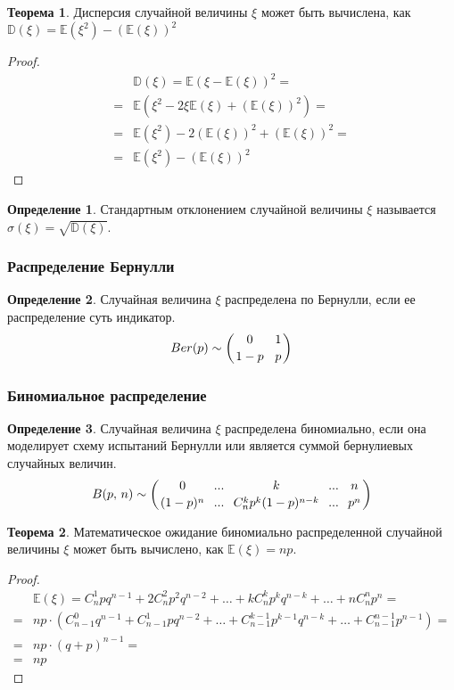\documentclass[12pt]{article}
\theoremstyle{definition}
\newtheorem{theorem}{Теорема}[section]
\newtheorem{definition}{Определение}
\newcommand{\E}{\mathbb{E}}
\newcommand{\D}{\mathbb{D}}
\begin{document}
\begin{theorem}
    Дисперсия случайной величины $\xi$ может быть вычислена, как $\D(\xi)=\E(\xi^2)-(\E(\xi))^2$
\end{theorem}

\begin{proof}
    \begin{align*}
        &\D(\xi)=\E(\xi-\E(\xi))^2=\\
        =&\E(\xi^2-2\xi\E(\xi)+(\E(\xi))^2)=\\
        =&\E(\xi^2)-2(\E(\xi))^2+(\E(\xi))^2=\\
        =&\E(\xi^2)-(\E(\xi))^2
    \end{align*}
\end{proof}

\begin{definition}
    Стандартным отклонением случайной величины $\xi$ называется $\sigma(\xi)=\sqrt{\D(\xi)}$.
\end{definition}

    \subsubsection{Распределение Бернулли}

\begin{definition}
    Случайная величина $\xi$  распределена по Бернулли, если ее распределение суть индикатор.
    $$Ber(p)\sim \left({0 \atop 1-p} \,\ \, {1 \atop p} \right)$$
\end{definition}

    \subsubsection{Биномиальное распределение}

\begin{definition}
    Случайная величина $\xi$ распределена биномиально, если она моделирует схему испытаний  Бернулли или является суммой бернулиевых случайных величин.
    $$B(p,\,n)\sim \left( {0 \atop (1-p)^n} \,\,\, {... \atop ...} \,\,\, {k \atop C_n^kp^k(1-p)^{n-k}} \,\,\, {... \atop ...} \,\,\, {n \atop p^n} \right)$$
\end{definition}

\begin{theorem}
    Математическое ожидание биномиально распределенной случайной величины $\xi$ может быть вычислено, как $\E(\xi)=np$.
\end{theorem}

\begin{proof}
    \begin{align*}
        &\E(\xi) = C_n^1pq^{n-1} + 2C_n^2p^2q^{n-2} + \ldots + kC_n^kp^kq^{n-k} + \ldots + nC_n^np^n = \\
        =& np \cdot (C_{n-1}^0q^{n-1} + C_{n-1}^1pq^{n-2}+\ldots + C_{n-1}^{k-1}p^{k-1}q^{n-k} + \ldots + C_{n-1}^{n-1}p^{n-1})=\\
        =& np \cdot (q+p)^{n-1}=\\
        =& np
    \end{align*}
\end{proof}
\end{document}

